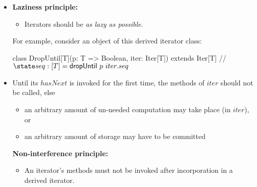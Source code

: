 \documentclass{ip3}
\begin{document}
\begin{code*}[Patterns.scala]
object Patterns {
\end{code*}
\begin{foil}
\begin{itemize}
        \item \textbf{Laziness principle:} 
        \begin{itemize}
            \item Iterators should be \textit{as lazy as possible}. 
        \end{itemize}
        \vitem For example, consider an object of this derived iterator class:        
\begin{scala}

        class DropUntil[T](p: T => Boolean, iter: Iter[T]) extends Iter[T] 
              // $\state seq: [T] = \mathsf{dropUntil}~p~iter.seq$
\end{scala}
        \item Until its $hasNext$ is invoked for the first time, the methods of $iter$ should not be called, else 
        \begin{itemize}
                \item an arbitrary amount of un-needed computation may take place (in $iter$), or
                \item an arbitrary amount of storage may have to be committed
        \end{itemize}
        
\vitem \textbf{Non-interference principle:} 
        \begin{itemize}
        \item An iterator's methods must not be invoked after incorporation in a derived iterator.
        \end{itemize}
\end{itemize} 
\end{foil}
\end{document}
